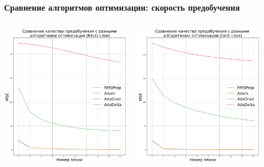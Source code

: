 \documentclass{beamer}
\begin{document}
\begin{frame}
  \frametitle{Сравнение алгоритмов оптимизации: скорость предобучения}
  \begin{columns}
    \begin{column}{0.5\textwidth}
      \includegraphics[width=\textwidth]{experiment-optimizers-pretrain-tall}
    \end{column}
    \begin{column}{0.5\textwidth}
      \includegraphics[width=\textwidth]{experiment-optimizers-pretrain-tanh-tall}

\end{column}
\end{columns}
\end{frame}
\end{document}
